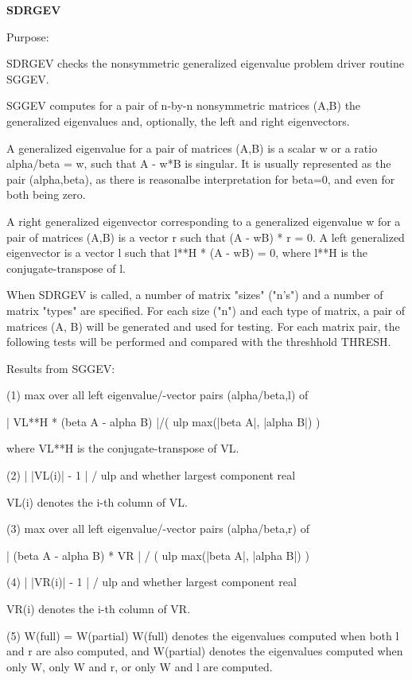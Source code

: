 {\bfseries S\+D\+R\+G\+E\+V} 

\begin{DoxyParagraph}{Purpose\+: }
\begin{DoxyVerb} SDRGEV checks the nonsymmetric generalized eigenvalue problem driver
 routine SGGEV.

 SGGEV computes for a pair of n-by-n nonsymmetric matrices (A,B) the
 generalized eigenvalues and, optionally, the left and right
 eigenvectors.

 A generalized eigenvalue for a pair of matrices (A,B) is a scalar w
 or a ratio  alpha/beta = w, such that A - w*B is singular.  It is
 usually represented as the pair (alpha,beta), as there is reasonalbe
 interpretation for beta=0, and even for both being zero.

 A right generalized eigenvector corresponding to a generalized
 eigenvalue  w  for a pair of matrices (A,B) is a vector r  such that
 (A - wB) * r = 0.  A left generalized eigenvector is a vector l such
 that l**H * (A - wB) = 0, where l**H is the conjugate-transpose of l.

 When SDRGEV is called, a number of matrix "sizes" ("n's") and a
 number of matrix "types" are specified.  For each size ("n")
 and each type of matrix, a pair of matrices (A, B) will be generated
 and used for testing.  For each matrix pair, the following tests
 will be performed and compared with the threshhold THRESH.

 Results from SGGEV:

 (1)  max over all left eigenvalue/-vector pairs (alpha/beta,l) of

      | VL**H * (beta A - alpha B) |/( ulp max(|beta A|, |alpha B|) )

      where VL**H is the conjugate-transpose of VL.

 (2)  | |VL(i)| - 1 | / ulp and whether largest component real

      VL(i) denotes the i-th column of VL.

 (3)  max over all left eigenvalue/-vector pairs (alpha/beta,r) of

      | (beta A - alpha B) * VR | / ( ulp max(|beta A|, |alpha B|) )

 (4)  | |VR(i)| - 1 | / ulp and whether largest component real

      VR(i) denotes the i-th column of VR.

 (5)  W(full) = W(partial)
      W(full) denotes the eigenvalues computed when both l and r
      are also computed, and W(partial) denotes the eigenvalues
      computed when only W, only W and r, or only W and l are
      computed.


\end{DoxyVerb}
\end{DoxyParagraph}
